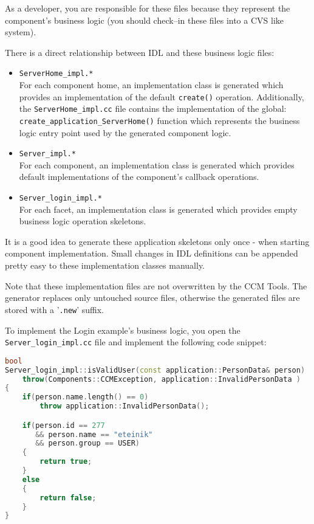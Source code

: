 As a developer, you are responsible for these files because they represent the
component's business logic (you should check--in these files into a CVS like system).

\vspace{3mm}
There is a direct relationship between IDL and these business logic files:
\begin{itemize}
	\item {\tt ServerHome\_impl.*}\\
	For each component home, an implementation class is generated which provides an
	implementation of the default {\tt create()} operation.
	Additionally, the {\tt ServerHome\_impl.cc} file contains the implementation of
	the global: \\
    {\tt create\_application\_ServerHome()} 
 	function which represents the business logic entry point used by the generated 
 	component logic. 

\item {\tt Server\_impl.*}\\
	For each component, an implementation class is generated which provides 
	default implementations of the component's callback operations.
	
\item {\tt Server\_login\_impl.*}\\
	For each facet, an implementation class is generated which provides empty
	business logic operation skeletons.
\end{itemize}

It is a good idea to generate these application skeletons only once - when starting 
component implementation. 
Small changes in IDL definitions can be appended pretty easy to these
implementation classes manually.

 \vspace{3mm}
Note that these implementation files are not overwritten by the CCM Tools.
The generator replaces only untouched source files, otherwise the
generated files are stored with a '{\tt .new}' suffix.

 \vspace{3mm}
To implement the Login example's business logic, you open the 
{\tt Server\_login\_impl.cc} file and implement the following code snippet:

\begin{footnotesize}
\begin{lstlisting}[language=C++]
bool
Server_login_impl::isValidUser(const application::PersonData& person)
    throw(Components::CCMException, application::InvalidPersonData )
{
    if(person.name.length() == 0)
        throw application::InvalidPersonData();

    if(person.id == 277 
       && person.name == "eteinik"
       && person.group == USER) 
    {
        return true;
    }
    else 
    {
        return false;
    }
}
\end{lstlisting}
\end{footnotesize}

